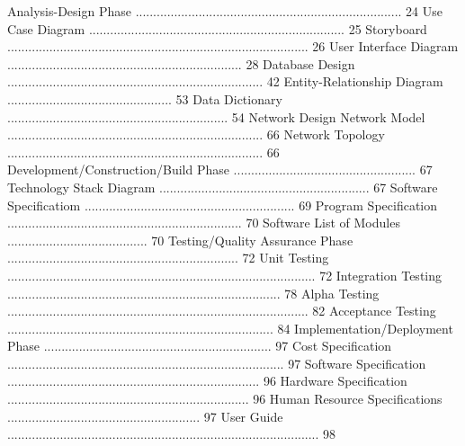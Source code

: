 Analysis-Design Phase 	          ............................................................................ 	        24
Use Case Diagram 	......................................................................... 	        25
Storyboard 	......................................................................................	        26
User Interface Diagram 	      ................................................................... 	        28
Database Design 	......................................................................... 	        42
Entity-Relationship Diagram 	............................................... 	        53
Data Dictionary	          ............................................................... 	        54
	Network Design
Network Model 	......................................................................... 	        66
Network Topology 	......................................................................... 	        66
Development/Construction/Build Phase 	        .................................................... 	        67
Technology Stack Diagram	............................................................ 	        67
Software Specificatiom		............................................................ 	        69
		Program Specification 	     ...................................................................	        70
Software List of Modules 	      ........................................ 	        70
	Testing/Quality Assurance Phase      ..................................................................	        72
		Unit Testing    ........................................................................................	        72
		Integration Testing    ..............................................................................	        78
		Alpha Testing	......................................................................................	        82
		Acceptance Testing    ............................................................................	        84
	Implementation/Deployment Phase    .................................................................	        97
Cost Specification    ...............................................................................	        97
		Software Specification    ........................................................................             96
		Hardware Specification     .....................................................................	        96
		Human Resource Specifications      .......................................................	        97
		User Guide     .........................................................................................	        98
